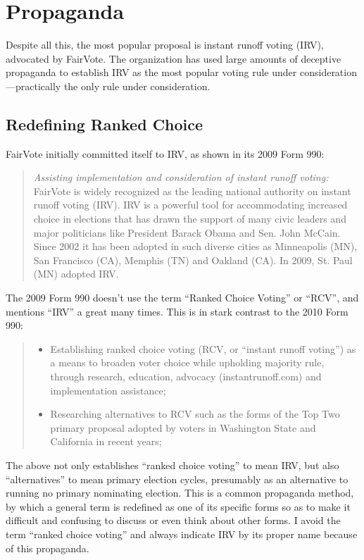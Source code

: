 \section{Propaganda}

Despite all this, the most popular proposal is instant runoff voting (IRV), advocated by FairVote.  The organization has used large amounts of deceptive propaganda to establish IRV as the most popular voting rule under consideration—practically the only rule under consideration.

\subsection{Redefining Ranked Choice}

FairVote initially committed itself to IRV, as shown in its 2009 Form 990:

\begin{quotation}
    \textit{Assisting implementation and consideration of instant runoff voting:}  FairVote is widely recognized as the leading national authority on instant runoff voting (IRV).  IRV is a powerful tool for accommodating increased choice in elections that has drawn the support of many civic leaders and major politicians like President Barack Obama and Sen. John McCain.  Since 2002 it has been adopted in such diverse cities as Minneapolis (MN), San Francisco (CA), Memphis (TN) and Oakland (CA).  In 2009, St. Paul (MN) adopted IRV.
\end{quotation}

The 2009 Form 990 doesn't use the term ``Ranked Choice Voting'' or ``RCV'', and mentions ``IRV'' a great many times.  This is in stark contrast to the 2010 Form 990:

\begin{quotation}
    \begin{itemize}
        \item Establishing ranked choice voting (RCV, or ``instant runoff voting'') as a means to broaden voter choice while upholding majority rule, through research, education, advocacy (instantrunoff.com) and implementation assistance;

        \item Researching alternatives to RCV such as the forms of the Top Two primary proposal adopted by voters in Washington State and California in recent years;
    \end{itemize}
\end{quotation}

The above not only establishes ``ranked choice voting'' to mean IRV, but also ``alternatives'' to mean primary election cycles, presumably as an alternative to running no primary nominating election.  This is a common propaganda method, by which a general term is redefined as one of its specific forms so as to make it difficult and confusing to discuss or even think about other forms.  I avoid the term ``ranked choice voting'' and always indicate IRV by its proper name because of this propaganda.

